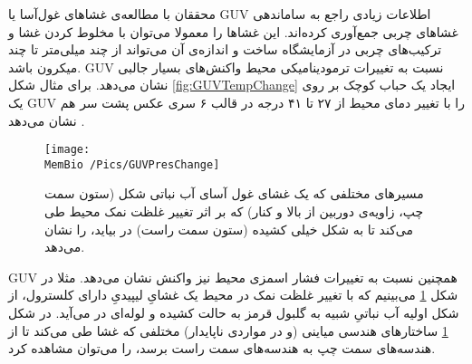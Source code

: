 محققان با مطالعه‌ی غشا‌های غول‌آسا
 یا 
 GUV اطلاعات  زیادی راجع به ساماندهی غشاهای چربی جمع‌آوری کرده‌اند. این غشا‌ها را معمولا می‌توان با  مخلوط کردن  
 غشا‌ و ترکیب‌های چربی در آزمایشگاه ساخت
 \cite{GUVmaking2009}
و اندازه‌ی آن می‌تواند از چند میلی‌متر تا چند میکرون  باشد. 
GUV نسبت به تغییرات ترمودینامیکی محیط واکنش‌های بسیار جالبی نشان می‌دهد. برای مثال شکل
\ref{fig:GUVTempChange}
ایجاد یک حباب کوچک بر روی یک GUV را با تغییر دمای محیط از ۲۷ تا ۴۱ درجه در قالب ۶ سری عکس پشت سر هم نشان می‌دهد
\cite{MemReviewRamakrishnan2014}.
 
\begin{figure}[h]
\begin{center}
\texttt{[image: \\MemBio /Pics/GUVPresChange]}
\caption{
مسیر‌های مختلفی که یک غشای غول آسای آب نباتی شکل (ستون سمت چپ، زاویه‌ی دوربین از بالا و کنار) که بر اثر تغییر غلظت نمک محیط طی می‌کند تا به شکل خیلی کشیده (ستون سمت راست) در بیاید، را نشان می‌دهد.
}
\label{fig:GUVPresChange}
\end{center}
\end{figure}

GUV همچنین نسبت به تغییرات فشار اسمزی محیط نیز واکنش نشان می‌دهد. مثلا در شکل 
\ref{fig:GUVPresChange}
می‌بینیم که با تغییر غلظت نمک در محیط یک غشایِ لیپیدیِ دارای کلسترول، از شکل اولیه آب نباتیِ  
شبیه‌ به گلبول قرمز به حالت کشیده و لوله‌ای در می‌آید. در شکل 
\ref{fig:GUVPresChange}
ساختار‌های هندسی میاینی (و در مواردی ناپایدار) مختلفی که غشا طی می‌کند تا از هندسه‌های سمت چپ به هندسه‌های سمت راست برسد، را می‌توان مشاهده کرد.
  
 
 
 
 
 
 
 
 
 
 